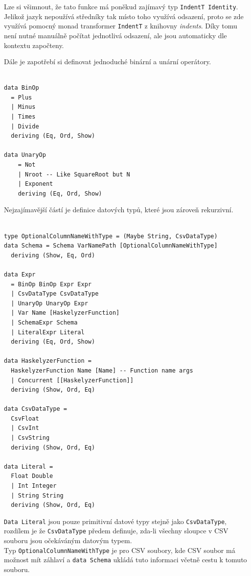 \documentclass[male,czech]{kithesis}
\newcommand{\haskellInline}[1]{\colorbox{gray!10}{\texttt{#1}}}
\begin{document}
Lze si všimnout, že tato funkce má poněkud zajímavý typ \haskellInline{IndentT Identity}.
Jelikož jazyk nepoužívá středníky tak místo toho využívá odsazení, proto se zde využívá 
pomocný monad transformer \haskellInline{IndentT} z knihovny \textit{indents}. 
Díky tomu není nutné manuálně počítat jednotlivá odsazení, ale jsou automaticky
dle kontextu započteny.

Dále je zapotřebí si definovat jednoduché binární a unární operátory.

\begin{verbatim}

data BinOp
  = Plus
  | Minus
  | Times
  | Divide
  deriving (Eq, Ord, Show)

data UnaryOp
    = Not
    | Nroot -- Like SquareRoot but N 
    | Exponent
    deriving (Eq, Ord, Show)

\end{verbatim}

Nejzajímavější částí je definice datových typů, které jsou zároveň rekurzivní. 

\begin{verbatim}

type OptionalColumnNameWithType = (Maybe String, CsvDataType)
data Schema = Schema VarNamePath [OptionalColumnNameWithType] 
  deriving (Show, Eq, Ord)

data Expr
  = BinOp BinOp Expr Expr
  | CsvDataType CsvDataType 
  | UnaryOp UnaryOp Expr 
  | Var Name [HaskelyzerFunction]
  | SchemaExpr Schema 
  | LiteralExpr Literal
  deriving (Eq, Ord, Show)

data HaskelyzerFunction = 
  HaskelyzerFunction Name [Name] -- Function name args
  | Concurrent [[HaskelyzerFunction]]
  deriving (Show, Ord, Eq)

data CsvDataType = 
  CsvFloat 
  | CsvInt 
  | CsvString 
  deriving (Show, Ord, Eq)

data Literal = 
  Float Double 
  | Int Integer
  | String String
  deriving (Show, Ord, Eq)

\end{verbatim}

\haskellInline{Data Literal} jsou pouze primitivní datové typy stejně jako
\haskellInline{CsvDataType}, rozdílem je že \haskellInline{CsvDataType} předem definuje, 
zda-li všechny sloupce v CSV souboru jsou očekáváným datovým typem. \\
Typ \haskellInline{OptionalColumnNameWithType} je pro CSV soubory, kde CSV soubor má možnost
mít záhlaví a \haskellInline{data Schema} ukládá tuto informaci včetně cestu k tomuto souboru. 
\end{document}
